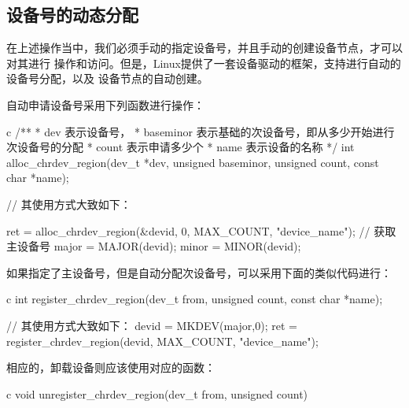 \subsection{设备号的动态分配}
在上述操作当中，我们必须手动的指定设备号，并且手动的创建设备节点，才可以对其进行
操作和访问。但是，Linux提供了一套设备驱动的框架，支持进行自动的设备号分配，以及
设备节点的自动创建。

自动申请设备号采用下列函数进行操作：
\begin{code-block}{c}
/**
* dev 表示设备号，
* baseminor 表示基础的次设备号，即从多少开始进行次设备号的分配
* count 表示申请多少个
* name 表示设备的名称
*/
int alloc_chrdev_region(dev_t *dev, unsigned baseminor,
    unsigned count, const char *name);

// 其使用方式大致如下：

ret = alloc_chrdev_region(&devid, 0, MAX_COUNT, "device_name");
// 获取主设备号
major = MAJOR(devid);
minor = MINOR(devid);
\end{code-block}

如果指定了主设备号，但是自动分配次设备号，可以采用下面的类似代码进行：
\begin{code-block}{c}
int register_chrdev_region(dev_t from, unsigned count, const char *name);

// 其使用方式大致如下：
devid = MKDEV(major,0);
ret = register_chrdev_region(devid, MAX_COUNT, "device_name");
\end{code-block}

相应的，卸载设备则应该使用对应的函数：
\begin{code-block}{c}
void unregister_chrdev_region(dev_t from, unsigned count)
\end{code-block}

